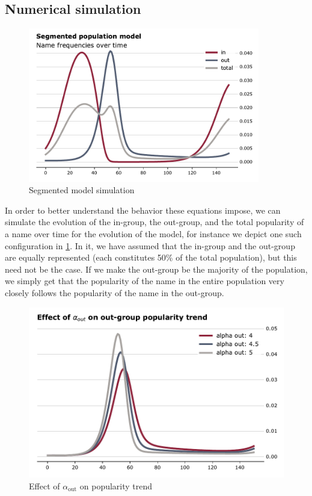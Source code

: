 \documentclass[a4paper]{article}
\begin{document}
\subsection{Numerical simulation}

\begin{figure}[h]
\centering
\includegraphics[width=0.9\textwidth]{figs/segmented-model.pdf}
\caption{Segmented model simulation}
\label{fig:segmented-model}
\end{figure}

In order to better understand the behavior these equations impose, we can
simulate the evolution of the in-group, the out-group, and the total popularity
of a name over time for the evolution of the model, for instance we depict one
such configuration in \cref{fig:segmented-model}. In it, we have assumed that
the in-group and the out-group are equally represented (each constitutes 50\% of
the total population), but this need not be the case. If we make the out-group
be the majority of the population, we simply get that the popularity of the name
in the entire population very closely follows the popularity of the name in the
out-group.

\begin{figure}[h]
\centering
\includegraphics[width=.9\textwidth]{figs/alpha-out.pdf}
\caption{Effect of $\alpha_\text{out}$ on popularity trend}
\label{fig:alpha-out}
\end{figure}
\end{document}
